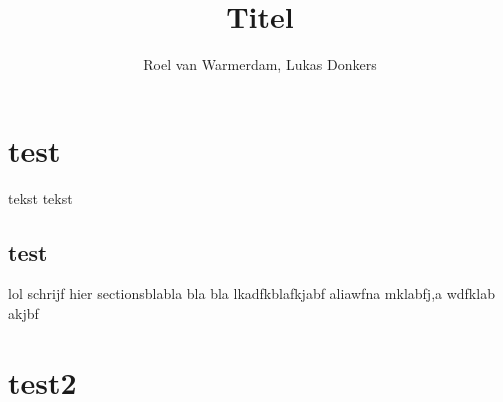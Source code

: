 \documentclass[12pt]{article}
\title{Titel}
\author{Roel van Warmerdam, Lukas Donkers}
\begin{document}
\maketitle

\begin{abstract}

\end{abstract}

\section{ test}

tekst tekst
\subsection{test}
lol 
schrijf hier sectionsblabla bla bla lkadfkblafkjabf aliawfna mklabfj,a wdfklab akjbf

\section{test2}
\end{document}
